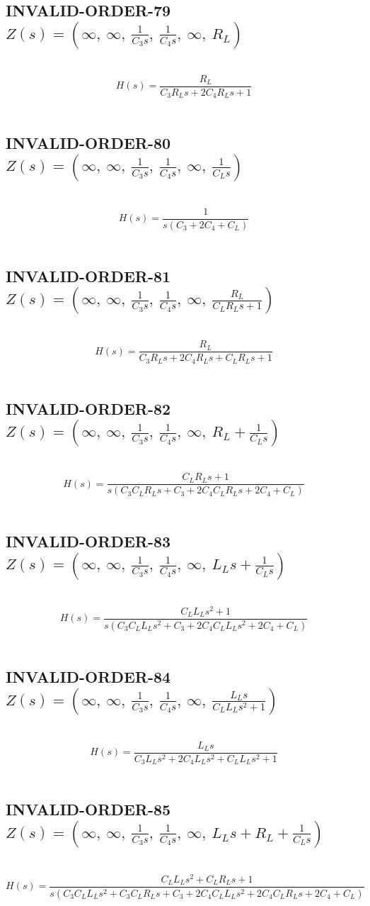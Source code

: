 \documentclass{article}
\begin{document}
\subsection{INVALID-ORDER-79 $Z(s) = \left( \infty, \  \infty, \  \frac{1}{C_{3} s}, \  \frac{1}{C_{4} s}, \  \infty, \  R_{L}\right)$ } \ 
\textbf{\[H(s) = \frac{R_{L}}{C_{3} R_{L} s + 2 C_{4} R_{L} s + 1}\] } \ 
\subsection{INVALID-ORDER-80 $Z(s) = \left( \infty, \  \infty, \  \frac{1}{C_{3} s}, \  \frac{1}{C_{4} s}, \  \infty, \  \frac{1}{C_{L} s}\right)$ } \ 
\textbf{\[H(s) = \frac{1}{s \left(C_{3} + 2 C_{4} + C_{L}\right)}\] } \ 
\subsection{INVALID-ORDER-81 $Z(s) = \left( \infty, \  \infty, \  \frac{1}{C_{3} s}, \  \frac{1}{C_{4} s}, \  \infty, \  \frac{R_{L}}{C_{L} R_{L} s + 1}\right)$ } \ 
\textbf{\[H(s) = \frac{R_{L}}{C_{3} R_{L} s + 2 C_{4} R_{L} s + C_{L} R_{L} s + 1}\] } \ 
\subsection{INVALID-ORDER-82 $Z(s) = \left( \infty, \  \infty, \  \frac{1}{C_{3} s}, \  \frac{1}{C_{4} s}, \  \infty, \  R_{L} + \frac{1}{C_{L} s}\right)$ } \ 
\textbf{\[H(s) = \frac{C_{L} R_{L} s + 1}{s \left(C_{3} C_{L} R_{L} s + C_{3} + 2 C_{4} C_{L} R_{L} s + 2 C_{4} + C_{L}\right)}\] } \ 
\subsection{INVALID-ORDER-83 $Z(s) = \left( \infty, \  \infty, \  \frac{1}{C_{3} s}, \  \frac{1}{C_{4} s}, \  \infty, \  L_{L} s + \frac{1}{C_{L} s}\right)$ } \ 
\textbf{\[H(s) = \frac{C_{L} L_{L} s^{2} + 1}{s \left(C_{3} C_{L} L_{L} s^{2} + C_{3} + 2 C_{4} C_{L} L_{L} s^{2} + 2 C_{4} + C_{L}\right)}\] } \ 
\subsection{INVALID-ORDER-84 $Z(s) = \left( \infty, \  \infty, \  \frac{1}{C_{3} s}, \  \frac{1}{C_{4} s}, \  \infty, \  \frac{L_{L} s}{C_{L} L_{L} s^{2} + 1}\right)$ } \ 
\textbf{\[H(s) = \frac{L_{L} s}{C_{3} L_{L} s^{2} + 2 C_{4} L_{L} s^{2} + C_{L} L_{L} s^{2} + 1}\] } \ 
\subsection{INVALID-ORDER-85 $Z(s) = \left( \infty, \  \infty, \  \frac{1}{C_{3} s}, \  \frac{1}{C_{4} s}, \  \infty, \  L_{L} s + R_{L} + \frac{1}{C_{L} s}\right)$ } \ 
\textbf{\[H(s) = \frac{C_{L} L_{L} s^{2} + C_{L} R_{L} s + 1}{s \left(C_{3} C_{L} L_{L} s^{2} + C_{3} C_{L} R_{L} s + C_{3} + 2 C_{4} C_{L} L_{L} s^{2} + 2 C_{4} C_{L} R_{L} s + 2 C_{4} + C_{L}\right)}\] } \ 
\end{document}
